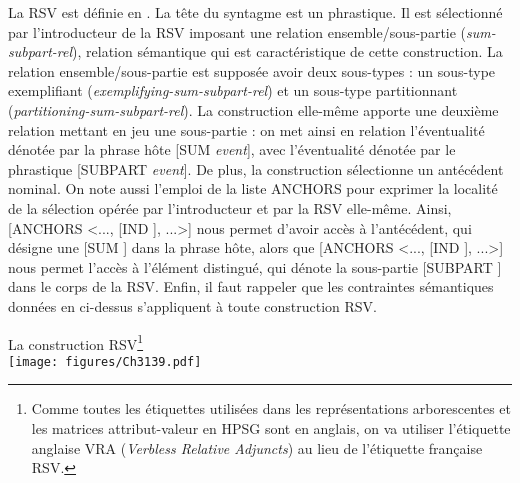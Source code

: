 La RSV est définie en . La tête du syntagme est un  phrastique. Il est sélectionné par l’introducteur de la RSV imposant une relation ensemble/sous-partie (\textit{sum-subpart-rel}), relation sémantique qui est caractéristique de cette cons\-truction. La relation ensemble/sous-partie est supposée avoir deux sous-types : un sous-type exemplifiant (\textit{exemplifying-sum-subpart-rel}) et un sous-type partitionnant (\textit{partitioning-sum-subpart-rel}). La construction elle-même apporte une deu\-xième relation mettant en jeu une sous-partie : on met ainsi en relation l’éven\-tualité dénotée par la phrase hôte [SUM  \textit{event}], avec l’éventualité dénotée par le  phrastique [SUBPART  \textit{event}]. De plus, la construction sélectionne un antécédent nominal. On note aussi l’emploi de la liste ANCHORS pour exprimer la localité de la sélection opérée par l’introducteur et par la RSV elle-même. Ainsi, [ANCHORS <..., [IND ], ...>] nous permet d’avoir accès à l’antécédent, qui désigne une  [SUM ] dans la phrase hôte, alors que [ANCHORS <..., [IND ], ...>] nous permet l’accès à l’élément distingué, qui dénote la sous-partie [SUBPART ] dans le corps de la RSV. Enfin, il faut rappeler que les contraintes sémantiques données en  ci-dessus s’appliquent à toute construction RSV.

\ea \label{ch3:ex139}
La construction RSV\footnote{Comme toutes les étiquettes utilisées dans les représentations arborescentes et les matrices attribut-valeur en HPSG sont en anglais, on va utiliser l’étiquette anglaise VRA (\textit{Verbless Relative Adjuncts}) au lieu de l’étiquette française RSV.}\\
\texttt{[image: figures/Ch3139.pdf]}

